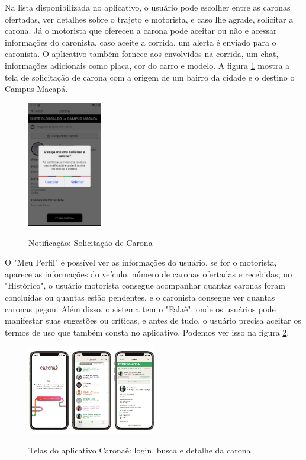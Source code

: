 Na lista disponibilizada no aplicativo, o usuário pode escolher entre as caronas ofertadas, ver detalhes sobre o trajeto e motorista, e caso lhe agrade, solicitar a carona. Já o motorista que ofereceu a carona pode aceitar ou não e acessar informações do caronista, caso aceite a corrida, um alerta é enviado para o caronista. O aplicativo também fornece aos envolvidos na corrida, um chat, informações adicionais como placa, cor do carro e modelo. A figura \ref{fig:solicitacao_de_carona} mostra a tela de solicitação de carona com a origem de um bairro da cidade e o destino o Campus Macapá.

\begin{figure}[!hbtp]
	\centering
	\caption{Notificação: Solicitação de Carona}
	\includegraphics[width=0.29\textwidth]{./04-figuras/caronae/tela_solicitacao_de_carona_2.png}
	\label{fig:solicitacao_de_carona}
\end{figure}

O "Meu Perfil" é possível ver as informações do usuário, se for o motorista, aparece as informações do veículo, número de caronas ofertadas e recebidas, no "Histórico", o usuário motorista consegue acompanhar quantas caronas foram concluídas ou quantas estão pendentes, e o caronista consegue ver quantas caronas pegou. Além disso, o sistema tem o "Falaê", onde os usuários pode manifestar suas sugestões ou críticas, e antes de tudo, o usuário precisa aceitar os termos de uso que também consta no aplicativo. Podemos ver isso na figura \ref{fig:telas_caronae}. 

\begin{figure}[!hbtp]
	\centering
	\caption{Telas do aplicativo Caronaê: login, busca e detalhe da carona}
	\includegraphics[width=0.5\textwidth]{./04-figuras/caronae-img-artigo.png}
	\label{fig:telas_caronae}
\end{figure}


